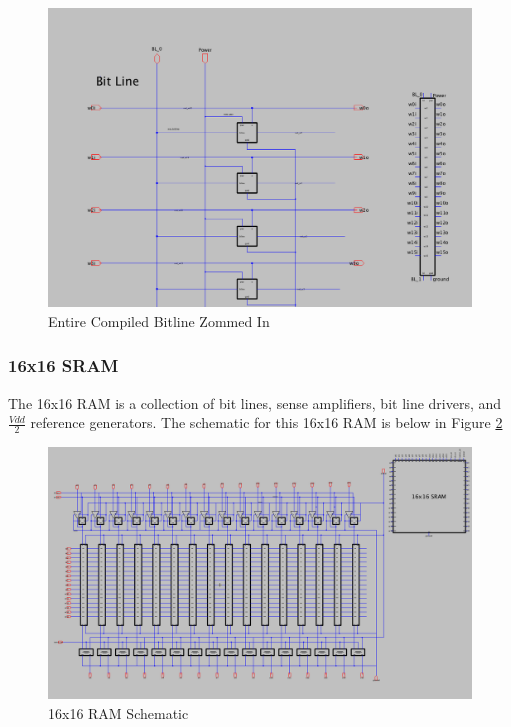 \documentclass[a4paper]{article}
\begin{document}
\begin{figure}[H]
	\centering
	\includegraphics[scale=0.3]{bitLineSchematicZoomedIn}
	\caption{Entire Compiled Bitline Zommed In}
	\label{fig:bitlineLongSchematic2}
\end{figure}


\subsubsection{16x16 SRAM}
\label{sec:16x16_sram_design}
The 16x16 RAM is a collection of bit lines, sense amplifiers, bit line drivers, and $\frac{Vdd}{2}$ reference generators. The schematic for this 16x16 RAM is below in Figure \ref{fig:memory16x16Schematic}

\begin{figure}[H]
	\centering
	\includegraphics[scale=0.3]{memory16x16Schematic}
	\caption{16x16 RAM Schematic}
	\label{fig:memory16x16Schematic}
\end{figure}
\end{document}
